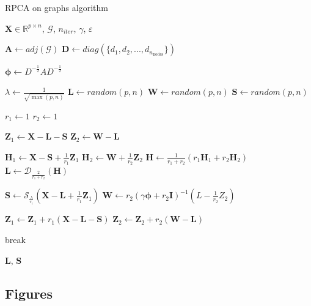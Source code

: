 \documentclass[sigconf]{acmart}
\begin{document}
  
  \begin{algorithm}[H]
  \caption{RPCA on graphs algorithm}\label{alg:our_pca}
  \begin{algorithmic}
      \Require $\mathbf{X} \in \mathbb{R}^{p \times n}$, $\mathcal{G}$, $n_{iter}$, $\gamma$, $\varepsilon$
      
      \State $\mathbf{A} \gets adj(\mathcal{G})$
      \State $\mathbf{D} \gets diag(\{d_1, d_2, ..., d_{n_{\text{nodes}}}\})$
      
      \State $\bm{\phi} \gets D^{-\frac{1}{2}} A D^{-\frac{1}{2}} $
      
      \State $\lambda \gets \frac{1}{\sqrt{\max(p, n)}}$
      \State $\mathbf{L} \gets random(p, n)$
      \State $\mathbf{W} \gets random(p, n)$
      \State $\mathbf{S} \gets random(p, n)$
      
      \State $r_1 \gets 1$
      \State $r_2 \gets 1$
      
      \State $\mathbf{Z}_1 \gets \mathbf{X} - \mathbf{L} - \mathbf{S}$
      \State $\mathbf{Z}_2 \gets \mathbf{W} - \mathbf{L}$
      
          \State $\mathbf{H}_1 \gets \mathbf{X} - \mathbf{S} + \frac{1}{r_1}\mathbf{Z}_1$
          \State $\mathbf{H}_2 \gets \mathbf{W} + \frac{1}{r_2}\mathbf{Z}_2$
          \State $\mathbf{H} \gets \frac{1}{r_1 + r_2} (r_1 \mathbf{H}_1 + r_2 \mathbf{H}_2)$
          \State $\mathbf{L} \gets \mathcal{D}_{\frac{2}{r_1 + r_2}}(\mathbf{H})$
      
          \State $\mathbf{S} \gets \mathcal{S}_{\frac{\lambda}{r_1}}(\mathbf{X} - \mathbf{L} + \frac{1}{r_1}\mathbf{Z}_1)$
          \State $\mathbf{W} \gets r_2 (\gamma \bm{\phi} + r_2 \mathbf{I})^{-1}(L - \frac{1}{r_2}Z_2)$
          
          \State $\mathbf{Z}_1 \gets \mathbf{Z}_1 + r_1(\mathbf{X} - \mathbf{L} - \mathbf{S})$
          \State $\mathbf{Z}_2 \gets \mathbf{Z}_2 + r_2(\mathbf{W} - \mathbf{L})$
      
              \State break\
          \EndIf
      
      \EndFor
      
      \State \Return $\mathbf{L}$, $\mathbf{S}$
  \end{algorithmic}
  \end{algorithm}

\subsection{Figures}





\end{document}

